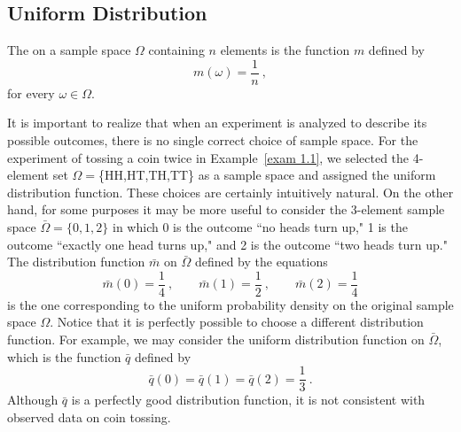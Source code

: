 \subsection*{Uniform Distribution}

\begin{definition}\label{def 1.3} 
The  on a sample space $\Omega$ 
containing $n$ elements is the function $m$ defined by
$$
m(\omega) = \frac1n\ ,
$$
for every $\omega \in \Omega$.
\end{definition}
It is important to realize that when an experiment is analyzed to describe
its
possible outcomes, there is no single correct choice of sample space.  For
the
experiment of tossing a coin twice in Example~\ref{exam 1.1},
we selected the 4-element set $\Omega = $\{HH,HT,TH,TT\} as a sample space
and
assigned the uniform distribution function.  These choices are certainly
intuitively natural.  On the other hand, for some purposes it may be more
useful
to consider the 3-element sample space $\bar\Omega = \{0,1,2\}$ in which
0
is the outcome ``no heads turn up," 1 is the outcome ``exactly one head
turns up," and 2 is the outcome ``two heads turn up."  The distribution function
$\bar m$ on $\bar\Omega$ defined by the equations
$$
\bar m(0) = \frac14\ ,\qquad \bar m(1) = \frac12\ , \qquad \bar
m(2) =
\frac14
$$
is the one corresponding to the uniform probability density on the original
sample space $\Omega$.  Notice that it is perfectly possible to choose a
different distribution function.  For example, we may consider the uniform
distribution function on $\bar\Omega$, which is the function $\bar q$
defined by
$$
\bar q(0) = \bar q(1) = \bar q(2) = \frac13\ .
$$
Although $\bar q$ is a perfectly good distribution function, it is not
consistent with observed data on coin tossing.
